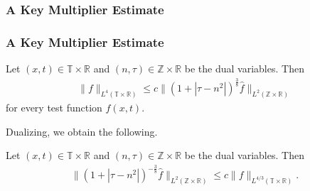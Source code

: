 \documentclass[handout]{beamer}
\numberwithin{equation}{section}
\newcommand{\rr}{\mathbb{R}}
\newcommand{\zz}{\mathbb{Z}}
\newcommand{\ci}{\mathbb{T}}
\newcommand{\wh}{\widehat}
\begin{document}
\subsubsection{A Key Multiplier Estimate}

\begin{frame}
	\frametitle{A Key Multiplier Estimate}

\begin{lemma}
	\label{lem:four-mult-est-L4}
	Let $(x, t) \in \ci \times \rr $ and $(n, \tau) \in \zz \times \rr$ be 
	the dual variables. Then
%
\begin{equation}
	\label{four-mult-est-L4}
	\begin{split}
		\|f\|_{L^4(\ci \times \rr)} \le c \|\left( 1 + | \tau - n^2 | 
		\right)^\frac{3}{8} \wh{f} \|_{L^2( \zz \times \rr)}
	\end{split}
\end{equation}
for every test function $f(x, t)$. 
%
%
%
%
\end{lemma}
%
%
Dualizing, we obtain the following.
%
%
%
%
%
%
%
%
\begin{corollary}
	\label{cor:four-mult-est-L4}
	Let $(x, t) \in \ci \times \rr $ and $(n, \tau) \in \zz \times \rr$ be the
	dual variables. Then %
%
\begin{equation}
	\label{four-mult-est-L4*}
	\begin{split}
		\| \left( 1 + | \tau - n^2 | 
		\right)^{-\frac{3}{8}}
		\wh{f}\|_{L^2(\zz \times \rr)} \le c \|f \|_{L^{4/3}( \ci \times \rr)}.
	\end{split}
\end{equation}
%
%

\end{corollary}
%
%
\end{frame}
\end{document}
